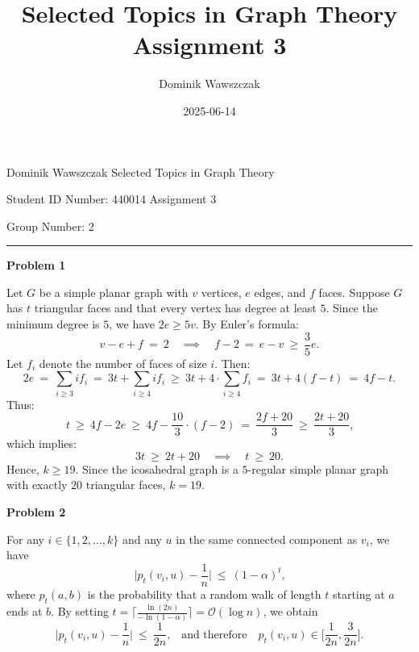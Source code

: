 \documentclass[12pt]{article}
\title{Selected Topics in Graph Theory Assignment 3}
\author{Dominik Wawszczak}
\date{2025-06-14}
\begin{document}
	\setlength{\parindent}{0 cm}
	
	Dominik Wawszczak \hfill Selected Topics in Graph Theory
	
	Student ID Number: 440014 \hfill Assignment 3
	
	Group Number: 2
	
	\bigskip
	\hrule
	\bigskip
	
	\textbf{Problem 1}
	
	\medskip
	
	Let \(G\) be a simple planar graph with \(v\) vertices, \(e\) edges, and
	\(f\) faces. Suppose \(G\) has \(t\) triangular faces and that every vertex
	has degree at least \(5\). Since the minimum degree is \(5\), we have \(2 e
	\geqslant 5 v\). By Euler's formula:
	\[
		v - e + f \ = \ 2 \quad \implies \quad f - 2 \ = \ e - v \ \geqslant \
		\frac{3}{5} e \text{.}
	\]
	Let \(f_{i}\) denote the number of faces of size \(i\). Then:
	\[
		2 e \ = \ \sum\limits_{i \geqslant 3} i f_{i} \ = \ 3 t +
		\sum\limits_{i \geqslant 4} i f_{i} \ \geqslant \ 3 t + 4 \cdot
		\sum\limits_{i \geqslant 4} f_{i} \ = \ 3 t + 4 (f - t) \ = \ 4 f - t
		\text{.}
	\]
	Thus:
	\[
		t \ \geqslant \ 4 f - 2 e \ \geqslant \ 4 f - \frac{10}{3} \cdot (f - 2)
		\ = \ \frac{2 f + 20}{3} \ \geqslant \ \frac{2 t + 20}{3} \text{,}
	\]
	which implies:
	\[
		3 t \ \geqslant \ 2 t + 20 \quad \implies \quad t \ \geqslant \ 20
		\text{.}
	\]
	Hence, \(k \geqslant 19\). Since the icosahedral graph is a \(5\)-regular
	simple planar graph with exactly \(20\) triangular faces, \(k = 19\).
	
	\bigskip
	
	\textbf{Problem 2}
	
	\medskip
	
	For any \(i \in \{1, 2, \ldots, k\}\) and any \(u\) in the same connected
	component as \(v_{i}\), we have
	\[
		\bigg| p_{t}(v_{i}, u) - \frac{1}{n} \bigg| \ \leqslant \
		(1 - \alpha)^{t} \text{,}
	\]
	where \(p_{t}(a, b)\) is the probability that a random walk of length \(t\)
	starting at \(a\) ends at \(b\). By setting \(t = \Big\lceil
	\frac{\ln (2 n)}{- \ln (1 - \alpha)} \Big\rceil = \mathcal{O}(\log n)\), we
	obtain
	\[
		\bigg| p_{t}(v_{i}, u) - \frac{1}{n} \bigg| \ \leqslant \ \frac{1}{2 n}
		\text{,} \quad \text{and therefore} \quad p_{t}(v_{i}, u) \in \bigg[
		\frac{1}{2 n}, \frac{3}{2 n} \bigg] \text{.}
	\]
	
	\medskip
	
\end{document}
